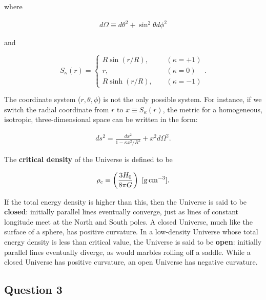 \documentclass[a4paper,11pt]{article}
\begin{document}
{\noindent}where

\begin{align*}
    d\Omega \equiv d\theta^2 + \sin^2\theta d\phi^2
\end{align*}

{\noindent}and

\begin{equation*}
    S_\kappa(r) =
    \left\{
    \begin{aligned}
    R\sin(r/R), ~~~~~& (\kappa = +1) \\
              r,~~~~~& (\kappa = 0) \\
    R\sinh(r/R),~~~~~& (\kappa = -1)
    \end{aligned}
    \right.
    .
\end{equation*}

{\noindent}The coordinate system ($r,\theta,\phi$) is not the only possible system. For instance, if we switch the radial coordinate from $r$ to $x \equiv S_\kappa(r)$, the metric for a homogeneous, isotropic, three-dimensional space can be written in the form:

\begin{align*}
    ds^2 = \frac{dx^2}{1-\kappa x^2/R^2} + x^2d\Omega^2.
\end{align*}

The \textbf{critical density} of the Universe is defined to be

\begin{align*}
    \rho_c \equiv \left( \frac{3H_0}{8\pi G} \right) ~ [{\rm g\,cm^{-3}}].
\end{align*}

{\noindent}If the total energy density is higher than this, then the Universe is said to be \textbf{closed}: initially parallel lines eventually converge, just as lines of constant longitude meet at the North and South poles. A closed Universe, much like the surface of a sphere, has positive curvature. In a low-density Universe whose total energy density is less than critical value, the Universe is said to be \textbf{open}: initially parallel lines eventually diverge, as would marbles rolling off a saddle. While a closed Universe has positive curvature, an open Universe has negative curvature.

%
%

\newpage
\subsection{Question 3}
\end{document}
